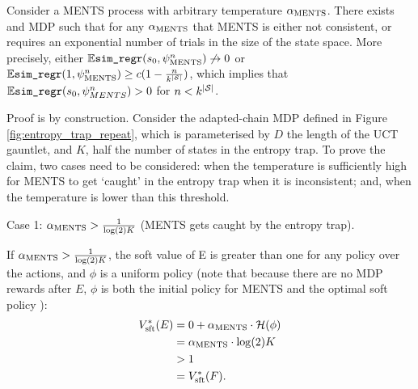         
        
        \begin{theorem} \label{thrm:ments_bad_mdp}
            Consider a MENTS process with arbitrary temperature ${\alpha_{{\textnormal{MENTS}}}}$. There exists and MDP such that for any ${\alpha_{{\textnormal{MENTS}}}}$ that MENTS is either not consistent, or requires an exponential number of trials in the size of the state space. More precisely, either $\mathbb{E}{\textnormal{\texttt{sim\_regr}}}(s_0,\psi^{n}_{{\textnormal{MENTS}}})\not\rightarrow 0$ or $\mathbb{E}{\textnormal{\texttt{sim\_regr}}}(1,\psi^{n}_{{\textnormal{MENTS}}}) \geq c(1 - \frac{n}{k^{|\mathcal{S}|}})$, which implies that $\mathbb{E}{\textnormal{\texttt{sim\_regr}}}(s_0,\psi^n_{MENTS})>0$ for $n<k^{|\mathcal{S}|}$. 
        \end{theorem}
        
        \begin{proofoutline}


            Proof is by construction. Consider the adapted-chain MDP  defined in Figure \ref{fig:entropy_trap_repeat}, which is parameterised by $D$ the length of the UCT gauntlet, and $K$, half the number of states in the entropy trap. To prove the claim, two cases need to be considered: when the temperature is sufficiently high for MENTS to get `caught' in the entropy trap when it is inconsistent; and, when the temperature is lower than this threshold.
            
            Case 1: ${\alpha_{{\textnormal{MENTS}}}}>\frac{1}{\log(2)K}$ (MENTS gets caught by the entropy trap).
            
            If ${\alpha_{{\textnormal{MENTS}}}}>\frac{1}{\log(2)K}$, the soft value of E is greater than one for any policy over the actions, and $\phi$ is a uniform policy (note that because there are no MDP rewards after $E$, $\phi$ is both the initial policy for MENTS and the optimal soft policy ): 
            \begin{align}
                    V_{{\textnormal{sft}}}^*(E) & = 0 + {\alpha_{{\textnormal{MENTS}}}} \cdot \mathcal{H}(\phi) \\
                        & = {\alpha_{{\textnormal{MENTS}}}} \cdot \log(2)  K \\
                        & > 1 \\
                        & = V_{{\textnormal{sft}}}^*(F).
            \end{align}
            

\end{proofoutline}
